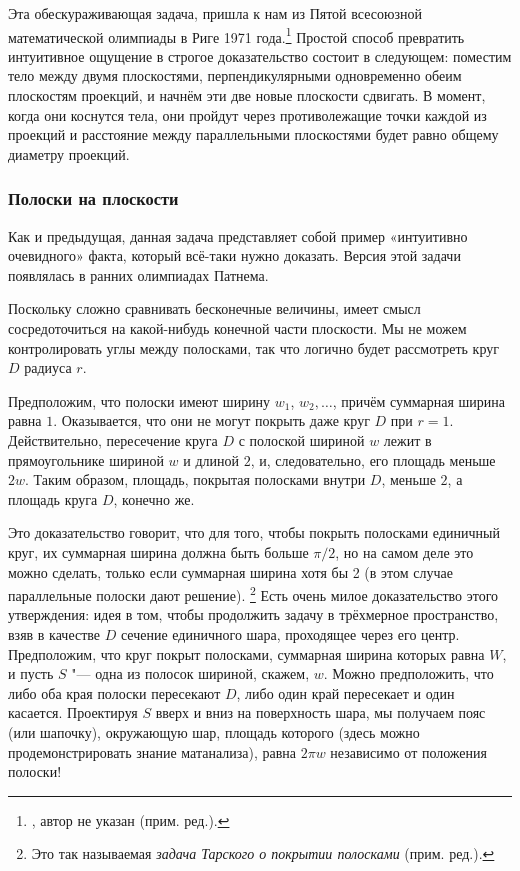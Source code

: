 \documentclass[twoside]{book}
\begin{document}
Эта обескураживающая задача, пришла к нам из Пятой всесоюзной математической олимпиады в Риге 1971 года.\footnote{\cite[№150]{ВсМО}, автор не указан (прим. ред.).}
Простой способ превратить интуитивное ощущение в строгое доказательство состоит в следующем: поместим тело между двумя плоскостями, перпендикулярными одновременно обеим плоскостям проекций, и начнём  эти две новые плоскости сдвигать.
В  момент, когда они коснутся тела, они пройдут через противолежащие точки каждой из проекций и расстояние между параллельными плоскостями будет равно общему диаметру проекций.
\heart

\subsubsection*{Полоски на плоскости}%

Как и предыдущая, данная задача представляет собой пример «интуитивно очевидного» факта, который всё-таки нужно доказать.
Версия этой задачи появлялась в ранних олимпиадах Патнема.

\medskip

Поскольку сложно сравнивать бесконечные величины, имеет смысл сосредоточиться на какой-нибудь конечной части плоскости.
Мы не можем контролировать углы между полосками, так что логично будет рассмотреть круг $D$ радиуса $r$.

Предположим, что полоски имеют ширину $w_1$, $w_2,\dots$, причём суммарная ширина равна $1$.
Оказывается, что они не могут покрыть даже круг $D$ при $r=1$.
Действительно, пересечение круга $D$ с полоской шириной $w$ лежит в прямоугольнике шириной $w$ и длиной $2$, и, следовательно, его площадь меньше $2w$.
Таким образом, площадь, покрытая полосками внутри $D$, меньше $2$, а площадь круга $D$, конечно же.
\heart 

Это доказательство говорит, что для того, чтобы покрыть полосками единичный круг, их суммарная ширина должна быть больше $\pi/2$, но на самом деле это можно сделать, только если суммарная ширина хотя бы 2 (в этом случае параллельные полоски дают решение).%
\footnote{Это так называемая \emph{задача Тарского о покрытии полосками} (прим. ред.).}
Есть очень милое доказательство этого утверждения:
идея в том, чтобы продолжить задачу в трёхмерное пространство, взяв в качестве $D$ сечение единичного шара, проходящее через его центр.
Предположим, что круг покрыт полосками, суммарная ширина которых равна $W$, и пусть $S$ "--- одна из полосок шириной, скажем, $w$.
Можно предположить, что либо оба края полоски пересекают $D$, либо один край пересекает и один касается.
Проектируя $S$ вверх и вниз на поверхность шара, мы получаем пояс (или шапочку),
окружающую шар, площадь которого (здесь можно продемонстрировать знание матанализа), равна 
$2\pi w$ независимо от положения полоски!
\end{document}

